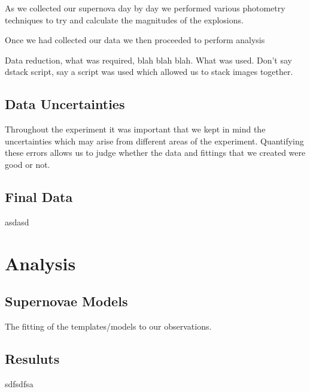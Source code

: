 \documentclass[twocolumn]{revtex4}
\begin{document}
As we collected our supernova day by day we performed various photometry techniques to try and calculate the magnitudes of the explosions. 

Once we had collected our data we then proceeded to perform analysis

Data reduction, what was required, blah blah blah. What was used. Don't say dstack script, say a script was used which allowed us to stack images together.

\vspace{-3ex}
\subsection{Data Uncertainties}
\vspace{-2ex}

Throughout the experiment it was important that we kept in mind the uncertainties which may arise from different areas of the experiment. Quantifying these errors allows us to judge whether the data and fittings that we created were good or not. 

\vspace{-3ex}
\subsection{Final Data}
\vspace{-2ex}

asdasd

\vspace{-3ex}
\section{Analysis}
\vspace{-2ex}
\subsection{Supernovae Models}
\vspace{-2ex}

The fitting of the templates/models to our observations.

\vspace{-3ex}
\subsection{Resuluts}
\vspace{-2ex}

sdfsdfsa
\end{document}
